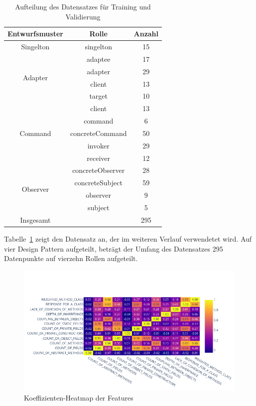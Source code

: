 \begin{table}[H]
    \begin{tabular}{|c|c|c|}
        \hline
        Entwurfsmuster & Rolle & Anzahl\\
        \hline
        Singelton & singelton & 15\\
        \hline
        \multirow{4}{*}{Adapter} & adaptee & 17\\ & adapter & 29\\ & client & 13\\ & target & 10\\
        \hline
        \multirow{5}{*}{Command} & client & 13\\ & command & 6\\ & concreteCommand & 50\\ & invoker & 29\\ & receiver & 12\\
        \hline
        \multirow{4}{*}{Observer} & concreteObserver & 28\\ & concreteSubject & 59\\ & observer & 9\\ & subject & 5\\
        \hhline{|=|=|=|}
        Insgesamt & & 295\\
        \hline
    \end{tabular}
    \caption{Aufteilung des Datensatzes für Training und Validierung}
    \label{tab:dataset_dist}
\end{table}

Tabelle~\ref{tab:dataset_dist} zeigt den Datensatz an, der im weiteren Verlauf verwendetet wird. Auf vier Design Pattern aufgeteilt,
beträgt der Umfang des Datensatzes 295 Datenpunkte auf vierzehn Rollen aufgeteilt.

\begin{figure}[h]
    \centering
    \includegraphics[scale=0.5]{figures/coff_heat_map.png}
    \caption{Koeffizienten-Heatmap der Features}
    \label{fig:coeff_heat_map}
\end{figure}


